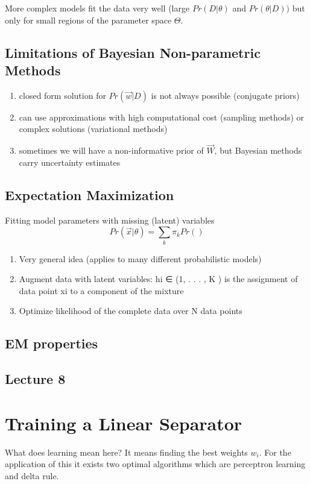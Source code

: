 \documentclass[12pt]{article}
\numberwithin{equation}{section}
\begin{document}
More complex models fit the data very well (large $Pr(D|\theta)$ and $Pr(\theta|D))$ but only for small regions of the parameter space $\Theta$.

\subsection{Limitations of Bayesian Non-parametric Methods}
\begin{enumerate}
\item closed form solution for $Pr(\vec{w}|D)$ is not always possible (conjugate priors)
\item can use approximations with high computational cost (sampling methods) or complex solutions (variational methods)
\item sometimes we will have a non-informative prior of $\vec{W}$, but Bayesian methods carry uncertainty estimates
\end{enumerate}

\subsection{Expectation Maximization}
Fitting model parameters with missing (latent) variables
\begin{equation}
Pr(\vec{x} | \theta )  = \sum_k \pi_k Pr()
\end{equation}
\begin{enumerate}
\item Very general idea (applies to many different probabilistic
models)
\item Augment data with latent variables: hi ∈ (1, . . . , K ) is the
assignment of data point xi to a component of the mixture
\item Optimize likelihood of the complete data over N data points
\end{enumerate}
\subsection{EM properties}










\subsection{Lecture 8}
\section{Training a Linear Separator}
What does learning mean here? It means finding the best weights $w_i$. For the application of this it exists two optimal algorithms which are perceptron learning and delta rule.
\end{document}
